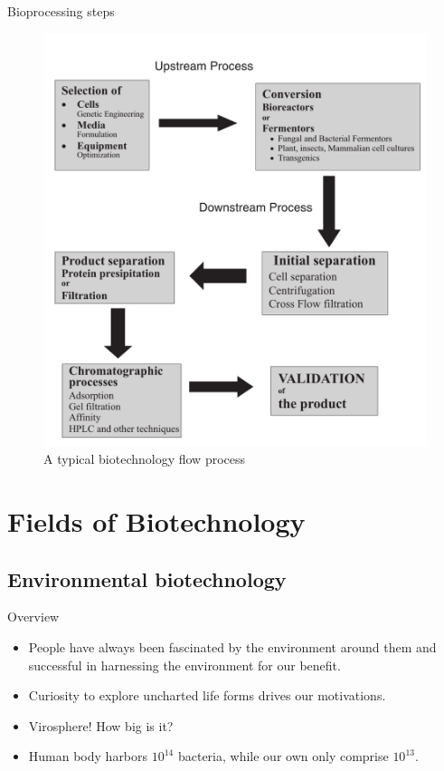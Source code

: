 \documentclass[
  ignorenonframetext,
  aspectratio=169]{beamer}
\providecommand{\tightlist}{%
  \setlength{\itemsep}{0pt}\setlength{\parskip}{0pt}}
\begin{document}
\begin{frame}{Bioprocessing steps}
\protect\hypertarget{bioprocessing-steps-1}{}
\begin{figure}
\includegraphics[width=0.4\linewidth]{../images/bioprocess_flow_chart} \caption{A typical biotechnology flow process}\label{fig:biotechnology-process}
\end{figure}
\end{frame}

\hypertarget{fields-of-biotechnology}{%
\section{Fields of Biotechnology}\label{fields-of-biotechnology}}

\hypertarget{environmental-biotechnology}{%
\subsection{Environmental
biotechnology}\label{environmental-biotechnology}}

\begin{frame}{Overview}
\protect\hypertarget{overview-1}{}
\begin{itemize}
\tightlist
\item
  People have always been fascinated by the environment around them and
  successful in harnessing the environment for our benefit.
\item
  Curiosity to explore uncharted life forms drives our motivations.
\item
  Virosphere! How big is it?
\item
  Human body harbors \(10^{14}\) bacteria, while our own only comprise
  \(10^{13}\).
\end{itemize}
\end{frame}
\end{document}
